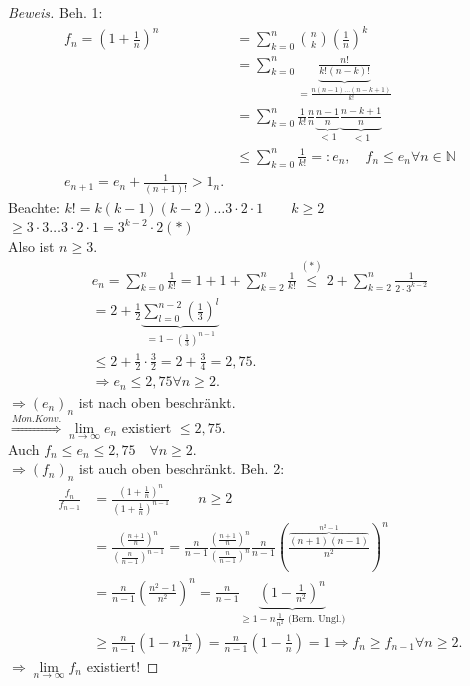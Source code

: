 \documentclass[12pt,a4paper,titlepage]{article} %
\theoremstyle{definition}
\theoremstyle{remark}
\newenvironment{bew}{\begin{proof}[Beweis]}{\end{proof}}
\newcommand{\N}{\mathbb{N}}
\newcommand{\limes}[1]{\lim\limits_{#1\rightarrow\infty}}
\begin{document}
\begin{bew}
	Beh. 1:
	\begin{align*}
		f_n = (1+\frac{1}{n})^n  &= \sum_{k=0}^{n} \binom{n}{k} \left( \frac{1}{n} \right)^k\\
		&= \sum_{k=0}^{n} \underbrace{\frac{n!}{k!(n-k)!}}_{=\frac{n(n-1)\ldots (n-k+1)}{k!}} \\
		&= \sum_{k=0}^{n} \frac{1}{k!} \frac{n}{n} \underbrace{\frac{n-1}{n}}_{<1} \underbrace{\frac{n-k+1}{n}}_{<1}\\
		&\leq \sum_{k=0}^{n} \frac{1}{k!} =: e_n, \quad f_n \leq e_n \forall n\in\N\\
		e_{n+1} = e_n + \frac{1}{(n+1)!} > 1_n.
	\end{align*}
	Beachte: \( k! = k(k-1)(k-2)\ldots3\cdot2\cdot1 \qquad k\geq 2 \)\\
	\( \geq 3\cdot3\ldots3\cdot2\cdot1 = 3^{k-2}\cdot2 (*) \)\\
	Also ist \(n\geq3\).
	\begin{align*}
		e_n = \sum_{k=0}^{n} \frac{1}{k!} = 1+1 + \sum_{k=2}^{n} \frac{1}{k!} \overset{(*)}{\leq} 2 + \sum_{k=2}^{n} \frac{1}{2 \cdot 3^{k-2}}\\
		= 2 + \frac{1}{2} \underbrace{\sum_{l=0}^{n-2} (\frac{1}{3})^l}_{=1-(\frac{1}{3})^{n-1}}\\
		\leq 2 + \frac{1}{2} \cdot \frac{3}{2} = 2 + \frac{3}{4} = 2,75.\\
		\Rightarrow e_n \leq 2,75 \forall n\geq 2.
	\end{align*}
	\(\Rightarrow (e_n)_n \) ist nach oben beschränkt.\\
	\( \overset{Mon. Konv.}{\Rightarrow} \limes{n} e_n \) existiert \(\leq 2,75\).\\
	Auch \( f_n\leq e_n\leq 2,75 \quad \forall n\geq 2 \).\\
	\( \Rightarrow (f_n)_n \) ist auch oben beschränkt.
	Beh. 2:\\
	\begin{align*}
		\frac{f_n}{f_{n-1}} &= \frac{(1+\frac{1}{n})^n}{(1+\frac{1}{n})^{n-1}} \qquad n\geq 2\\
		&= \frac{(\frac{n+1}{n})^n}{(\frac{n}{n-1})^{n-1}} = \frac{n}{n-1} \frac{(\frac{n+1}{n})^n}{(\frac{n}{n-1})^{n}} \frac{n}{n-1} \left( \frac{\overbrace{(n+1)(n-1)}^{n^2-1}}{n^2} \right)^n\\
		&= \frac{n}{n-1} \left( \frac{n^2-1}{n^2} \right)^n = \frac{n}{n-1} \underbrace{\left( 1-\frac{1}{n^2} \right)^n}_{\geq 1-n \frac{1}{n^2} \text{ (Bern. Ungl.)}}\\
		&\geq \frac{n}{n-1} (1-n \frac{1}{n^2}) = \frac{n}{n-1} (1-\frac{1}{n}) = 1 \Rightarrow f_n \geq f_{n-1} \forall n\geq 2.
	\end{align*}
	\( \Rightarrow \limes{n} f_n \) existiert!
\end{bew}
\end{document}
